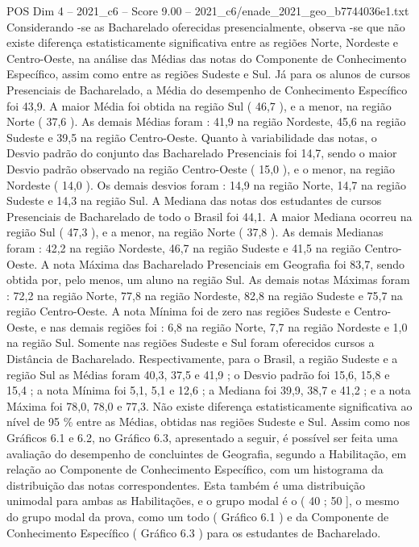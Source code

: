 \begin{textsample}{POS Dim 4 – 2021\_c6 – Score 9.00 – 2021\_c6/enade\_2021\_geo\_b7744036e1.txt}
Considerando -se as Bacharelado oferecidas presencialmente, observa -se que não existe diferença estatisticamente significativa entre as regiões Norte, Nordeste e Centro-Oeste, na análise das Médias das notas do Componente de Conhecimento Específico, assim como entre as regiões Sudeste e Sul.
Já para os alunos de cursos Presenciais de Bacharelado, a Média do desempenho de Conhecimento Específico foi 43,9.
A maior Média foi obtida na região Sul ( 46,7 ), e a menor, na região Norte ( 37,6 ).
As demais Médias foram : 41,9 na região Nordeste, 45,6 na região Sudeste e 39,5 na região Centro-Oeste.
Quanto à variabilidade das notas, o Desvio padrão do conjunto das Bacharelado Presenciais foi 14,7, sendo o maior Desvio padrão observado na região Centro-Oeste ( 15,0 ), e o menor, na região Nordeste ( 14,0 ).
Os demais desvios foram : 14,9 na região Norte, 14,7 na região Sudeste e 14,3 na região Sul.
A Mediana das notas dos estudantes de cursos Presenciais de Bacharelado de todo o Brasil foi 44,1.
A maior Mediana ocorreu na região Sul ( 47,3 ), e a menor, na região Norte ( 37,8 ).
As demais Medianas foram : 42,2 na região Nordeste, 46,7 na região Sudeste e 41,5 na região Centro-Oeste.
A nota Máxima das Bacharelado Presenciais em Geografia foi 83,7, sendo obtida por, pelo menos, um aluno na região Sul.
As demais notas Máximas foram : 72,2 na região Norte, 77,8 na região Nordeste, 82,8 na região Sudeste e 75,7 na região Centro-Oeste.
A nota Mínima foi de zero nas regiões Sudeste e Centro-Oeste, e nas demais regiões foi : 6,8 na região Norte, 7,7 na região Nordeste e 1,0 na região Sul.
Somente nas regiões Sudeste e Sul foram oferecidos cursos a Distância de Bacharelado.
Respectivamente, para o Brasil, a região Sudeste e a região Sul as Médias foram 40,3, 37,5 e 41,9 ; o Desvio padrão foi 15,6, 15,8 e 15,4 ; a nota Mínima foi 5,1, 5,1 e 12,6 ; a Mediana foi 39,9, 38,7 e 41,2 ; e a nota Máxima foi 78,0, 78,0 e 77,3.
Não existe diferença estatisticamente significativa ao nível de 95 \% entre as Médias, obtidas nas regiões Sudeste e Sul.
Assim como nos Gráficos 6.1 e 6.2, no Gráfico 6.3, apresentado a seguir, é possível ser feita uma avaliação do desempenho de concluintes de Geografia, segundo a Habilitação, em relação ao Componente de Conhecimento Específico, com um histograma da distribuição das notas correspondentes.
Esta também é uma distribuição unimodal para ambas as Habilitações, e o grupo modal é o ( 40 ; 50 ], o mesmo do grupo modal da prova, como um todo ( Gráfico 6.1 ) e da Componente de Conhecimento Específico ( Gráfico 6.3 ) para os estudantes de Bacharelado.

\end{textsample}
